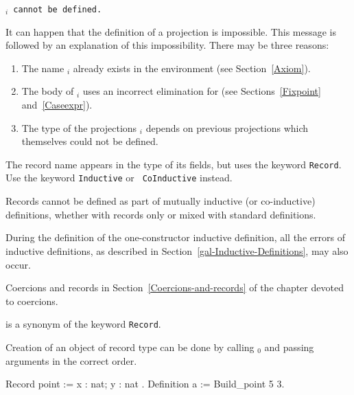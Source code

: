 \begin{Warnings}
\item {\tt {\ident$_i$} cannot be defined.}

  It can happen that the definition of a projection is impossible.
  This message is followed by an explanation of this impossibility.
  There may be three reasons:
   \begin{enumerate}
   \item The name {\ident$_i$} already exists in the environment (see
     Section~\ref{Axiom}).
   \item The body of {\ident$_i$} uses an incorrect elimination for
     {\ident} (see Sections~\ref{Fixpoint} and~\ref{Caseexpr}).
   \item The type of the projections {\ident$_i$} depends on previous
   projections which themselves could not be defined.
   \end{enumerate}  
\end{Warnings}     

\begin{ErrMsgs}

\item {}

  The record name {\ident} appears in the type of its fields, but uses
  the keyword  {\tt Record}. Use  the keyword {\tt Inductive}  or {\tt
    CoInductive} instead.
\item {}

  Records  cannot  be  defined  as  part  of  mutually  inductive  (or
  co-inductive) definitions,  whether with records only  or mixed with
  standard definitions.
\item During the definition of the one-constructor inductive
  definition, all the errors of inductive definitions, as described in
  Section~\ref{gal-Inductive-Definitions}, may also occur.

\end{ErrMsgs}

\SeeAlso Coercions and records in Section~\ref{Coercions-and-records}
of the chapter devoted to coercions.

 is a synonym of the keyword {\tt Record}.

\Rem Creation of an object of record type can be done by calling {\ident$_0$}
and passing arguments in the correct order.

\begin{coq_example}
Record point := { x : nat; y : nat }.
Definition a := Build_point 5 3.
\end{coq_example}

